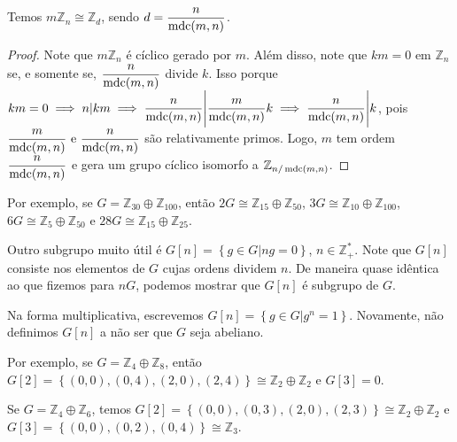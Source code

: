     	\begin{prop}
    	\label{regra nG}
    		Temos $m\mathbb{Z}_n\cong\mathbb{Z}_d$, sendo $\displaystyle{ d = \frac{n}{\operatorname{mdc}(m,n)} }$.
    	\end{prop}
    	\begin{proof}
    		Note que $m\mathbb{Z}_n$ é cíclico gerado por $m$. Além disso, note que $km = 0$ 
    		em $\mathbb{Z}_n$ se, e somente se, $\displaystyle{\frac{n}{\operatorname{mdc}(m,n)}  }$ divide $k$. 
    		Isso porque $km = 0\implies n| km\implies \displaystyle{ \frac{n}{\operatorname{mdc}(m,n)}
    		\Bigg| \frac{m}{\operatorname{mdc}(m,n)}k }\implies \displaystyle{ \frac{n}{\operatorname{mdc}(m,n)}\Bigg| k }$, pois
    		$\displaystyle{ \frac{m}{\operatorname{mdc}(m,n)}\text{ e }\frac{n}{\operatorname{mdc}(m,n)}  }$ são relativamente primos. 
    		Logo, $m$ tem ordem $\displaystyle{\frac{n}{\operatorname{mdc}(m,n)}}$ e gera um grupo cíclico isomorfo a
    		$\mathbb{Z}_{n/\operatorname{mdc}(m,n)}$.
    	\end{proof}
    	\par\vspace{0.3cm} Por exemplo, se $G = \mathbb{Z}_{30}\oplus\mathbb{Z}_{100}$, então 
    	$2G \cong \mathbb{Z}_{15}\oplus\mathbb{Z}_{50}$, 
    	$3G \cong \mathbb{Z}_{10}\oplus\mathbb{Z}_{100}$, 
    	$6G \cong \mathbb{Z}_5\oplus\mathbb{Z}_{50}$ e 
    	$28G \cong \mathbb{Z}_{15}\oplus\mathbb{Z}_{25}$.
    	
    	\par\vspace{0.3cm} Outro subgrupo muito útil é $G[n] = \left\{ g\in G\vert ng=0 \right\}$,
    	$n\in\mathbb{Z}_+^\ast$. Note que $G[n]$ consiste nos elementos de $G$ cujas ordens dividem $n$. 
    	De maneira quase idêntica ao que fizemos para $nG$, podemos mostrar que $G[n]$ é subgrupo de $G$.
    	
    	\par\vspace{0.3cm} Na forma multiplicativa, escrevemos $G[n] = \left\{ g\in G\vert g^n=1 \right\}$.
    	Novamente, não definimos $G[n]$ a não ser que $G$ seja abeliano. 
    	
    	\par\vspace{0.3cm} Por exemplo, se $G = \mathbb{Z}_4\oplus\mathbb{Z}_8$, então 
    	$G[2] = \left\{ (0,0), (0,4), (2,0), (2,4) \right\}\cong\mathbb{Z}_2\oplus\mathbb{Z}_2$ e $G[3] = 0$.
    	
    	\par\vspace{0.3cm} Se $G = \mathbb{Z}_4\oplus\mathbb{Z}_6$, temos 
    	$G[2] = \left\{ (0,0), (0,3), (2,0), (2,3) \right\}\cong \mathbb{Z}_2\oplus\mathbb{Z}_2$ e 
    	$G[3] = \left\{ (0,0), (0,2), (0,4) \right\}\cong\mathbb{Z}_3$.
    	

